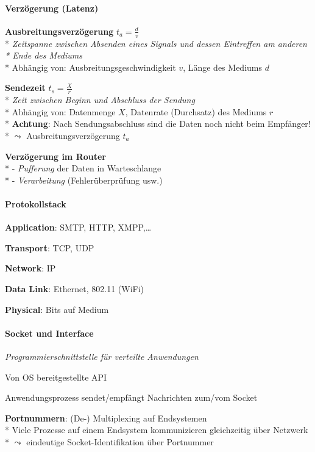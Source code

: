 \paragraph{Verzögerung (Latenz)}
\begin{items}
  \item \textbf{Ausbreitungsverzögerung} \( t_a = \tfrac{d}{v} \) \\*
    \emph{Zeitspanne zwischen Absenden eines Signals und dessen Eintreffen am anderen \\* \phantom{-} Ende des Mediums} \\*
    Abhängig von: Ausbreitungsgeschwindigkeit \( v \), Länge des Mediums \( d \)
  \item \textbf{Sendezeit} \( t_s = \tfrac{X}{r} \) \\*
    \emph{Zeit zwischen Beginn und Abschluss der Sendung} \\*
    Abhängig von: Datenmenge \( X \), Datenrate (Durchsatz) des Mediums \( r \) \\*
    \textbf{Achtung}: Nach Sendungsabschluss sind die Daten noch nicht beim Empfänger! \\* \phantom{-} \( \leadsto \) Ausbreitungsverzögerung \( t_a \)
  \item \textbf{Verzögerung im Router} \\*
    - \emph{Pufferung} der Daten in Warteschlange \\*
    - \emph{Verarbeitung} (Fehlerüberprüfung usw.)
\end{items}

\paragraph{Protokollstack}
\begin{items}
  \item \textbf{Application}: SMTP, HTTP, XMPP,\dots
  \item \textbf{Transport}: TCP, UDP
  \item \textbf{Network}: IP
  \item \textbf{Data Link}: Ethernet, 802.11 (WiFi)
  \item \textbf{Physical}: Bits auf Medium
\end{items}

\paragraph{Socket und Interface}
\begin{items}
  \item \emph{Programmierschnittstelle für verteilte Anwendungen}
  \item Von OS bereitgestellte API
  \item Anwendungsprozess sendet/empfängt Nachrichten zum/vom Socket
  \item \textbf{Portnummern}: (De-) Multiplexing auf Endsystemen \\*
    Viele Prozesse auf einem Endsystem kommunizieren gleichzeitig über Netzwerk \\*
    \phantom{-} \( \leadsto \) eindeutige Socket-Identifikation über Portnummer
\end{items}

